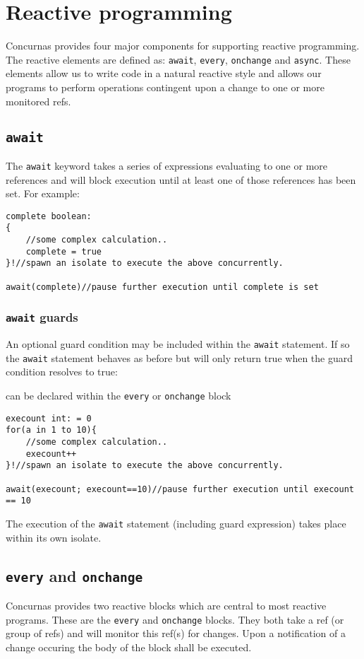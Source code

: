\documentclass[conc-doc]{subfiles}
\begin{document}
\section{Reactive programming}
\label{sec:reactive}
Concurnas provides four major components for supporting reactive programming. The reactive elements are defined as: \lstinline{await}, \lstinline{every}, \lstinline{onchange} and \lstinline{async}. These elements allow us to write code in a natural reactive style and allows our programs to perform operations contingent upon a change to one or more monitored refs.


\subsection{\lstinline{await}}
The \lstinline{await} keyword takes a series of expressions evaluating to one or more references and will block execution until at least one of those references has been set. For example:

\begin{lstlisting}
complete boolean:
{
	//some complex calculation..
	complete = true
}!//spawn an isolate to execute the above concurrently.

await(complete)//pause further execution until complete is set
\end{lstlisting}

\subsubsection{\lstinline{await} guards}
An optional guard condition may be included within the \lstinline{await} statement. If so the \lstinline{await} statement behaves as before but will only return true when the guard condition resolves to true:

can be declared within the \lstinline{every} or \lstinline{onchange} block
\begin{lstlisting}
execount int: = 0
for(a in 1 to 10){
	//some complex calculation..
	execount++
}!//spawn an isolate to execute the above concurrently.

await(execount; execount==10)//pause further execution until execount == 10
\end{lstlisting}	

The execution of the \lstinline{await} statement (including guard expression) takes place within its own isolate.

\subsection{\lstinline{every} and \lstinline{onchange}}
Concurnas provides two reactive blocks which are central to most reactive programs. These are the \lstinline{every} and \lstinline{onchange} blocks. They both take a ref (or group of refs) and will monitor this ref(s) for changes. Upon a notification of a change occuring the body of the block shall be executed.
\end{document}
